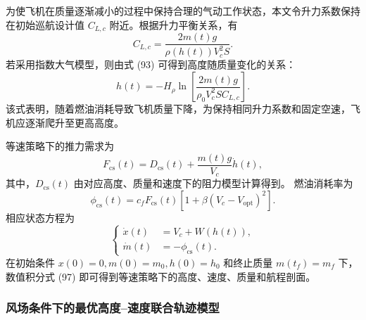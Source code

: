 \documentclass[UTF8]{ctexart}
\begin{document}
为使飞机在质量逐渐减小的过程中保持合理的气动工作状态，本文令升力系数保持在初始巡航设计值
$C_{L,c}$ 附近。根据升力平衡关系，有
\begin{equation}
    C_{L,c}
    =
    \frac{2m(t)g}{\rho(h(t))V_c^2S}.
    \label{eq:q4_CL_const}
\end{equation}
若采用指数大气模型，则由式 (93) 可得到高度随质量变化的关系：
\begin{equation}
    h(t)
    =
    -H_\rho
    \ln
    \left[
    \frac{2m(t)g}{\rho_0V_c^2SC_{L,c}}
    \right].
    \label{eq:q4_h_m_const_speed}
\end{equation}
该式表明，随着燃油消耗导致飞机质量下降，为保持相同升力系数和固定空速，飞机应逐渐爬升至更高高度。

等速策略下的推力需求为
\begin{equation}
    F_{\mathrm{cs}}(t)
    =
    D_{\mathrm{cs}}(t)
    +
    \frac{m(t)g}{V_c}\dot h(t),
    \label{eq:q4_F_const_speed}
\end{equation}
其中，$D_{\mathrm{cs}}(t)$ 由对应高度、质量和速度下的阻力模型计算得到。
燃油消耗率为
\begin{equation}
    \phi_{\mathrm{cs}}(t)
    =
    c_fF_{\mathrm{cs}}(t)
    \left[
    1+\beta\left(V_c-V_{\mathrm{opt}}\right)^2
    \right].
    \label{eq:q4_phi_const_speed}
\end{equation}
相应状态方程为
\begin{equation}
\left\{
\begin{aligned}
    \dot x(t)&=V_c+W(h(t)),\\
    \dot m(t)&=-\phi_{\mathrm{cs}}(t).
\end{aligned}
\right.
\label{eq:q4_cs_ode}
\end{equation}
在初始条件 $x(0)=0,m(0)=m_0,h(0)=h_0$ 和终止质量 $m(t_f)=m_f$ 下，
数值积分式 (97) 即可得到等速策略下的高度、速度、质量和航程剖面。

\subsubsection{风场条件下的最优高度--速度联合轨迹模型}
\end{document}
